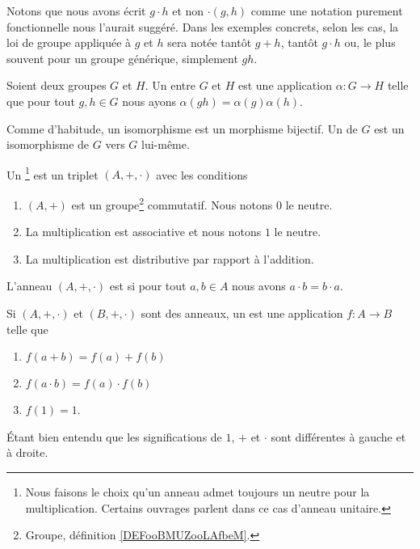 Notons que nous avons écrit \( g\cdot h\) et non \( \cdot(g,h)\) comme une notation purement fonctionnelle nous l'aurait suggéré. Dans les exemples concrets, selon les cas, la loi de groupe appliquée à \( g\) et \( h\) sera notée tantôt \( g+h\), tantôt \( g\cdot h\) ou, le plus souvent pour un groupe générique, simplement \( gh\).

\begin{definition}        \label{DEFooBEHTooMeCOTX}
    Soient deux groupes \( G\) et \( H\). Un  entre \( G\) et \( H\) est une application \( \alpha\colon G\to H\) telle que pour tout \( g,h\in G\) nous ayons \( \alpha(gh)=\alpha(g)\alpha(h)\).

    Comme d'habitude, un isomorphisme est un morphisme bijectif. Un  de \( G\) est un isomorphisme de \( G\) vers \( G\) lui-même.
\end{definition}

\begin{definition}     \label{DefHXJUooKoovob}
    Un \footnote{Nous faisons le choix qu'un anneau admet toujours un neutre pour la multiplication. Certains ouvrages parlent dans ce cas d'anneau unitaire.} est un triplet \( (A,+,\cdot)\) avec les conditions
    \begin{enumerate}
        \item
            \( (A,+)\) est un groupe\footnote{Groupe, définition \ref{DEFooBMUZooLAfbeM}.} commutatif. Nous notons \( 0\) le neutre.
        \item
            La multiplication est associative et nous notons \( 1\) le neutre.
        \item       \label{ITEMooGMNOooSTGiXw}
            La multiplication est distributive par rapport à l'addition.
    \end{enumerate}
    L'anneau \( (A,+,\cdot)\) est  si pour tout \( a,b\in A\) nous avons \( a\cdot b=b\cdot a\).
\end{definition}


\begin{definition}      \label{DEFooSPHPooCwjzuz}
    Si \( (A,+,\cdot)\) et \( (B,+,\cdot)\) sont des anneaux, un  est une application \( f\colon A\to B\) telle que
    \begin{enumerate}
        \item \( f(a+b)=f(a)+f(b)\)
        \item
            \( f(a\cdot b)=f(a)\cdot f(b)\)
        \item
            \( f(1)=1\).
    \end{enumerate}
    Étant bien entendu que les significations de \( 1\), $+$ et \( \cdot\) sont différentes à gauche et à droite.
\end{definition}



